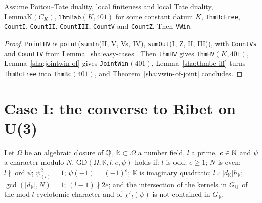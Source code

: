 \begin{theorem}\label{sha:vwin-of-counts}
Assume Poitou--Tate duality, local finiteness and local Tate duality, $\mathrm{LemmaK}(C_K)$,
$\texttt{ThmBab}(K,401)$ for some constant datum $K$, \texttt{ThmBcFree}, \texttt{CountI},
\texttt{CountII}, \texttt{CountIII}, \texttt{CountV} and \texttt{CountZ}. Then \texttt{VWin}.
\end{theorem}
\begin{proof}
\texttt{PointHV} is \texttt{point}(\texttt{sumIn}(II, V, Vs, IV), \texttt{sumOut}(I, Z, II, III)),
with \texttt{CountVs} and \texttt{CountIV} from Lemma~\ref{sha:easy-cases}. Then
\texttt{thmHV} gives \texttt{ThmHV}$(K,401)$, Lemma~\ref{sha:jointwin-of} gives
\texttt{JointWin}$(401)$, Lemma~\ref{sha:thmbc-iff} turns \texttt{ThmBcFree} into
\texttt{ThmBc}$(401)$, and Theorem~\ref{sha:vwin-of-joint} concludes.
\end{proof}

\section{Case I: the converse to Ribet on U(3)}

\begin{definition}\label{sha:gd}
Let $\Omega$ be an algebraic closure of $\mathbb{Q}$, $\mathbb K\subset\Omega$ a number field, $l$ a
prime, $e\in\mathbb{N}$ and $\psi$ a character modulo $N$. $\mathrm{GD}(\Omega,\mathbb K,l,e,\psi)$
holds if: $l$ is odd; $e\ge1$; $N$ is even; $l\nmid\operatorname{ord}\psi$;
$\psi_{(l)}^2=1$; $\psi(-1)=(-1)^e$; $\mathbb K$ is imaginary quadratic;
$l\nmid|d_{\mathbb K}|h_{\mathbb K}$; $\gcd(|d_{\mathbb K}|,N)=1$; $(l-1)\nmid2e$; and the
intersection of the kernels in $G_{\mathbb{Q}}$ of the mod-$l$ cyclotomic character and of
$\chi'_l(\psi)$ is not contained in $G_{\mathbb K}$.
\end{definition}

